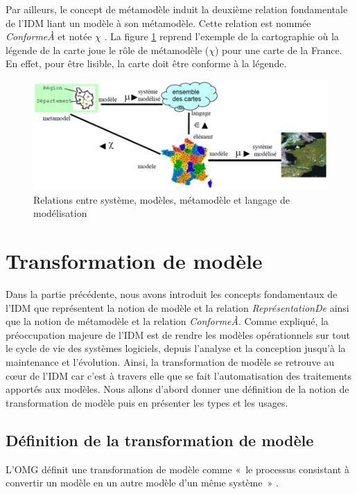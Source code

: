 Par ailleurs, le concept de métamodèle induit la deuxième relation fondamentale 
de l'IDM liant un modèle à son métamodèle. Cette relation est nommée 
\textit{ConformeÀ} et notée $\chi$ \cite{bezivin2004search} 
\cite{favre2004towards}. La figure \ref{fig:carteFavre} reprend l'exemple de la 
cartographie où la légende de la carte joue le rôle de métamodèle ($\chi$) pour 
une carte de la France. En effet, pour être lisible, la carte doit être conforme 
à la légende.

\begin{figure}[!htbp]
 \begin{center}
  \includegraphics[width=1\textwidth]{images/Chapitre1/cartecompleteIDM.png}
 \end{center}
 \caption{Relations entre système, modèles, métamodèle et langage de 
modélisation \protect\cite{favre2006ingenierie}}
 \label{fig:carteFavre}
\end{figure}

\section{Transformation de modèle}
Dans la partie précédente, nous avons introduit les concepts fondamentaux de 
l'IDM que représentent la notion de modèle et la relation 
\textit{ReprésentationDe} ainsi que la notion de métamodèle et la relation 
\textit{ConformeÀ}. Comme expliqué, la préoccupation majeure de l'IDM est de 
rendre les modèles opérationnels sur tout le cycle de vie des systèmes 
logiciels, depuis l'analyse et la conception jusqu'à la maintenance et 
l'évolution. Ainsi, la transformation de modèle se retrouve au cœur de l'IDM car 
c'est à travers elle que se fait l'automatisation des traitements apportés aux 
modèles. Nous allons d'abord donner une définition de la notion de 
transformation de modèle puis en présenter les types et les usages.

\subsection{Définition de la transformation de modèle}
L'OMG définit une transformation de modèle comme «~le processus consistant à 
convertir un modèle en un autre modèle d'un même système~» \cite{omg2011meta}. 

